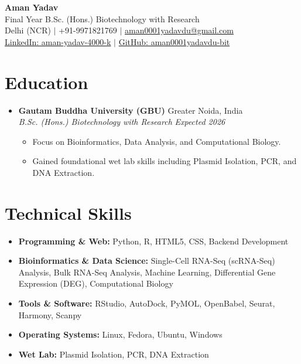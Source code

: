\documentclass[13pt,a4paper]{article}
\newcommand{\resumeItem}[1]{\item\small{#1}}
\newcommand{\resumeSubheading}[4]{
  \vspace{4pt}\item
    \textbf{#1} \hfill #2 \\
    \textit{#3} \hfill \textit{#4} \vspace{-4pt}
}
\begin{document}
\begin{center}
    {\Huge \textbf{Aman Yadav}} \\ \vspace{4pt}
    {\large Final Year B.Sc. (Hons.) Biotechnology with Research} \\ \vspace{2pt}
    \small Delhi (NCR) $|$ +91-9971821769 $|$ \href{mailto:aman0001yadavdu@gmail.com}{\color{primary}aman0001yadavdu@gmail.com} \\
    \href{https://www.linkedin.com/in/aman-yadav-4000-k/}{\color{primary}LinkedIn: aman-yadav-4000-k} $|$
    \href{https://github.com/aman0001yadavdu-bit}{\color{primary}GitHub: aman0001yadavdu-bit}
\end{center}

\section{Education}
\begin{itemize}[leftmargin=0.15in, label={}]
    \resumeSubheading
        {Gautam Buddha University (GBU)}{Greater Noida, India}
        {B.Sc. (Hons.) Biotechnology with Research}{Expected 2026}
        \begin{itemize}
            \resumeItem{Focus on Bioinformatics, Data Analysis, and Computational Biology.}
            \resumeItem{Gained foundational wet lab skills including Plasmid Isolation, PCR, and DNA Extraction.}
        \end{itemize}
\end{itemize}

\section{Technical Skills}
\begin{itemize}[leftmargin=0.15in, label={}]
    \item \textbf{Programming \& Web:} Python, R, HTML5, CSS, Backend Development
    \item \textbf{Bioinformatics \& Data Science:} Single-Cell RNA-Seq (scRNA-Seq) Analysis, Bulk RNA-Seq Analysis, Machine Learning, Differential Gene Expression (DEG), Computational Biology
    \item \textbf{Tools \& Software:} RStudio, AutoDock, PyMOL, OpenBabel, Seurat, Harmony, Scanpy
    \item \textbf{Operating Systems:} Linux, Fedora, Ubuntu, Windows
    \item \textbf{Wet Lab:} Plasmid Isolation, PCR, DNA Extraction
\end{itemize}
\end{document}
